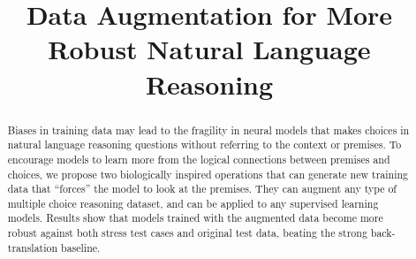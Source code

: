 \documentclass{article}
\title{Data Augmentation for More Robust Natural Language Reasoning}
\author{
}
\begin{document}
\maketitle

\begin{abstract}
Biases in training data may lead to the fragility in neural models
that makes choices in natural language reasoning questions without
referring to the context or premises. 
To encourage models to learn more from the logical connections between 
premises and choices, we propose two biologically inspired operations 
that can generate new training data that ``forces'' the model
to look at the premises. They can augment
any type of multiple choice reasoning dataset, and can be applied to
any supervised learning models. Results show that models trained
with the augmented data become more robust against both stress test cases and original
test data, beating the strong back-translation baseline.

\end{abstract}









\end{document}

